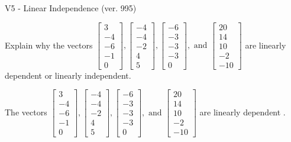 \begin{exercise}
  \begin{exerciseTitle}V5 - Linear Independence (ver. 995)\end{exerciseTitle}
  \begin{exerciseStatement}
    Explain why the vectors \(\left[\begin{array}{r}
3 \\
-4 \\
-6 \\
-1 \\
0
\end{array}\right] , \left[\begin{array}{r}
-4 \\
-4 \\
-2 \\
4 \\
5
\end{array}\right] , \left[\begin{array}{r}
-6 \\
-3 \\
-3 \\
-3 \\
0
\end{array}\right] , \text{ and } \left[\begin{array}{r}
20 \\
14 \\
10 \\
-2 \\
-10
\end{array}\right]\) are linearly dependent or linearly independent.	


  \end{exerciseStatement}
  \begin{exerciseAnswer}
   The vectors \(\left[\begin{array}{r}
3 \\
-4 \\
-6 \\
-1 \\
0
\end{array}\right] , \left[\begin{array}{r}
-4 \\
-4 \\
-2 \\
4 \\
5
\end{array}\right] , \left[\begin{array}{r}
-6 \\
-3 \\
-3 \\
-3 \\
0
\end{array}\right] , \text{ and } \left[\begin{array}{r}
20 \\
14 \\
10 \\
-2 \\
-10
\end{array}\right]\) are 
  	 linearly dependent  .
  


  \end{exerciseAnswer}
\end{exercise}